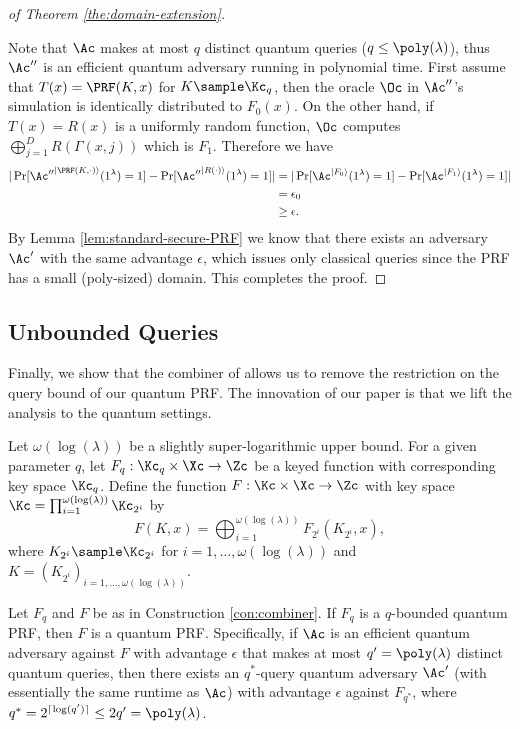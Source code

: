 \begin{proof}[of Theorem \ref{the:domain-extension}]
\begin{center}
\begin{minipage}[t]{0.5\textwidth}
		\end{minipage}
	\end{center}
%
Note that $\Ac$ makes at most $q$ distinct quantum queries ($q\le \poly(\lambda)$), thus $\Ac''$ is an efficient quantum adversary running in polynomial time. First assume that $T(x)=\PRF(K,x)$ for $K\sample\Kc_q$, then the oracle $\Oc$ in $\Ac''$'s simulation is identically distributed to $F_0(x)$. On the other hand, if $T(x)=R(x)$ is a uniformly random function, $\Oc$ computes $\bigoplus^{D}_{j=1} R(\Gamma(x,j))$ which is $F_1$. Therefore we have
	\begin{align*}
		|\Pr[{\Ac''}^{|\PRF(K,\cdot)\rangle}(1^\lambda)=1]-\Pr[{\Ac''}^{|R(\cdot)\rangle}(1^\lambda)=1]|
			&= |\Pr[\Ac^{|F_0\rangle}(1^\lambda)=1]-\Pr[\Ac^{|F_1\rangle}(1^\lambda)=1]|\\
			&= \epsilon_0 \\
			&\ge \epsilon.
	\end{align*}
%
By Lemma  \ref{lem:standard-secure-PRF} we know that there exists an adversary $\Ac'$ with the same advantage $\epsilon$, which issues only classical queries since the PRF has a small (poly-sized) domain. This completes the proof.
\end{proof}

	
\subsection{Unbounded Queries}
	Finally, we show that the combiner of \cite{C:DotSch15} allows us to remove the restriction on the query bound of our quantum PRF. The innovation of our paper is that we lift the analysis to the quantum settings.

	\begin{construction}\label{con:combiner}
		Let $\omega(\log(\lambda))$ be a slightly super-logarithmic upper bound. For a given parameter $q$, let $F_q:\Kc_q\times\Xc\to\Zc$ be a keyed function with corresponding key space $\Kc_q$. Define the function $F:\Kc\times\Xc\to\Zc$ with key space $\Kc=\prod^{\omega(\log(\lambda))}_{i=1}\Kc_{2^i}$ by $$F(K,x)=\bigoplus^{\omega(\log(\lambda))}_{i=1}F_{2^i}(K_{2^i},x),$$ where $K_{2^i}\sample\Kc_{2^i}$ for $i=1,\dots,\omega(\log(\lambda))$ and $K=(K_{2^i})_{i=1,\dots,\omega(\log(\lambda))}$.
	\end{construction}

	\begin{theorem}\label{the:combiner}
		Let $F_q$ and $F$ be as in Construction \ref{con:combiner}. If $F_q$ is a $q$-bounded quantum PRF, then $F$ is a quantum PRF. Specifically, if $\Ac$ is an efficient quantum adversary against $F$ with advantage $\epsilon$ that makes at most $q' =\poly(\lambda)$ distinct quantum queries, then there exists an $q^*$-query quantum adversary $\Ac'$ (with essentially the same runtime as $\Ac$) with advantage $\epsilon$ against $F_{q^*}$, where $q^*=2^{\lceil\log(q')\rceil}\le 2q' = \poly(\lambda)$.
	\end{theorem}
	
